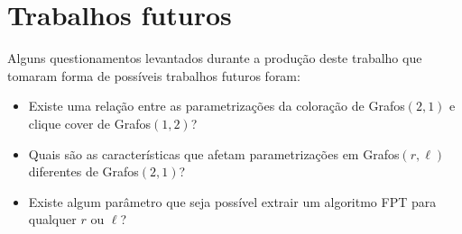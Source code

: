 \section{Trabalhos futuros}
Alguns questionamentos levantados durante a produção deste trabalho que tomaram forma de possíveis trabalhos futuros foram:
\begin{itemize}
  \item Existe uma relação entre as parametrizações da coloração de Grafos$(2,1)$ e clique cover de Grafos$(1,2)$?
  \item Quais são as características que afetam parametrizações em Grafos$(r,\ell)$ diferentes de Grafos$(2,1)$?
  \item Existe algum parâmetro que seja possível extrair um algoritmo FPT para qualquer $r$ ou $\ell$?
\end{itemize}
